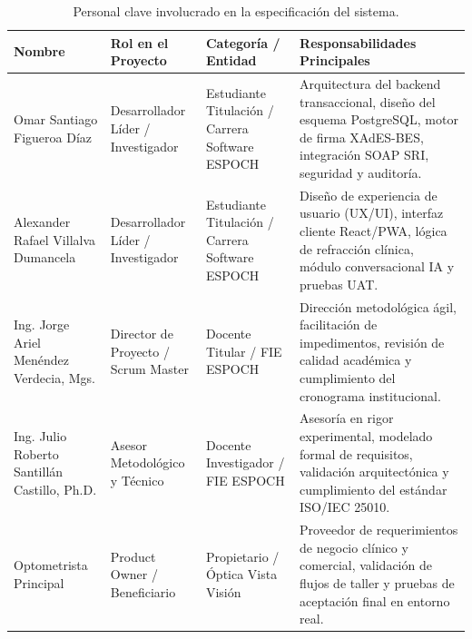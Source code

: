 \documentclass[12pt,a4paper]{report}
\begin{document}
\begin{table}[H]
\centering
\small
\begin{tabularx}{\textwidth}{|L{3.8cm}|L{3.2cm}|L{3.2cm}|X|}
\hline
{}\color{white}\textbf{Nombre} & \color{white}\textbf{Rol en el Proyecto} & \color{white}\textbf{Categoría / Entidad} & \color{white}\textbf{Responsabilidades Principales} \\
\hline
Omar Santiago Figueroa Díaz & Desarrollador Líder / Investigador & Estudiante Titulación / Carrera Software ESPOCH & Arquitectura del backend transaccional, diseño del esquema PostgreSQL, motor de firma XAdES-BES, integración SOAP SRI, seguridad y auditoría. \\
\hline
Alexander Rafael Villalva Dumancela & Desarrollador Líder / Investigador & Estudiante Titulación / Carrera Software ESPOCH & Diseño de experiencia de usuario (UX/UI), interfaz cliente React/PWA, lógica de refracción clínica, módulo conversacional IA y pruebas UAT. \\
\hline
Ing. Jorge Ariel Menéndez Verdecia, Mgs. & Director de Proyecto / Scrum Master & Docente Titular / FIE ESPOCH & Dirección metodológica ágil, facilitación de impedimentos, revisión de calidad académica y cumplimiento del cronograma institucional. \\
\hline
Ing. Julio Roberto Santillán Castillo, Ph.D. & Asesor Metodológico y Técnico & Docente Investigador / FIE ESPOCH & Asesoría en rigor experimental, modelado formal de requisitos, validación arquitectónica y cumplimiento del estándar ISO/IEC 25010. \\
\hline
Optometrista Principal & Product Owner / Beneficiario & Propietario / Óptica Vista Visión & Proveedor de requerimientos de negocio clínico y comercial, validación de flujos de taller y pruebas de aceptación final en entorno real. \\
\hline
\end{tabularx}
\caption{Personal clave involucrado en la especificación del sistema.}
\label{tab:personal}
\end{table}
\end{document}
